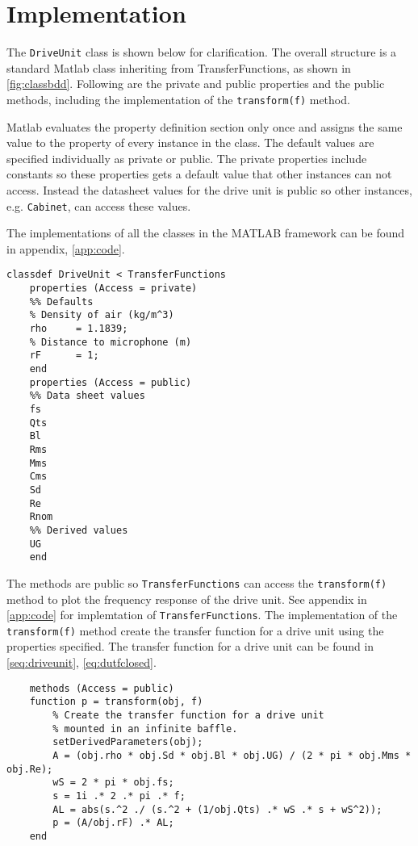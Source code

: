 \section{Implementation}
The \texttt{DriveUnit} class is shown below for clarification. 
The overall structure is a standard Matlab class inheriting from TransferFunctions, as shown in \cref{fig:classbdd}. 
Following are the private and public properties and the public methods, including the implementation of the \texttt{transform(f)} method.

Matlab evaluates the property definition section only once and assigns the same value to the property of every instance in the class.
The default values are specified individually as private or public.
The private properties include constants so these properties gets a default value that other instances can not access. 
Instead the datasheet values for the drive unit is public so other instances, e.g. \texttt{Cabinet}, can access these values.

The implementations of all the classes in the MATLAB framework can be found in appendix, \cref{app:code}. 


\begin{verbatim}
classdef DriveUnit < TransferFunctions
    properties (Access = private)
	%% Defaults
	% Density of air (kg/m^3)
	rho     = 1.1839;
	% Distance to microphone (m)
	rF      = 1;
	end
    properties (Access = public)
	%% Data sheet values
	fs
	Qts
	Bl
	Rms
	Mms
	Cms
	Sd
	Re
	Rnom
	%% Derived values
	UG
    end
\end{verbatim}

The methods are public so \texttt{TransferFunctions} can access the \texttt{transform(f)} method to plot the frequency response of the drive unit. See appendix in \cref{app:code} for implemtation of \texttt{TransferFunctions}.
The implementation of the \texttt{transform(f)} method create the transfer function for a drive unit using the properties specified.
The transfer function for a drive unit can be found in \cref{seq:driveunit}, \cref{eq:dutfclosed}.

\begin{verbatim}
    methods (Access = public)
	function p = transform(obj, f)
	    % Create the transfer function for a drive unit
	    % mounted in an infinite baffle.
	    setDerivedParameters(obj);
	    A = (obj.rho * obj.Sd * obj.Bl * obj.UG) / (2 * pi * obj.Mms * obj.Re);
	    wS = 2 * pi * obj.fs;
	    s = 1i .* 2 .* pi .* f;
	    AL = abs(s.^2 ./ (s.^2 + (1/obj.Qts) .* wS .* s + wS^2));
	    p = (A/obj.rF) .* AL;
	end
\end{verbatim}

